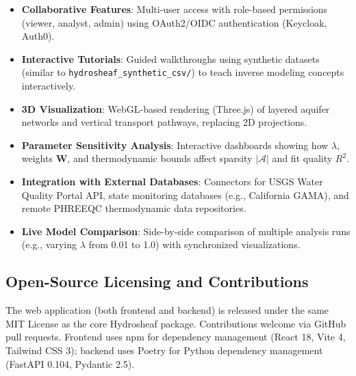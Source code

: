 \begin{itemize}
	\item \textbf{Collaborative Features}: Multi-user access with role-based permissions (viewer, analyst, admin) using OAuth2/OIDC authentication (Keycloak, Auth0).
	\item \textbf{Interactive Tutorials}: Guided walkthroughs using synthetic datasets (similar to \texttt{hydrosheaf\_synthetic\_csv/}) to teach inverse modeling concepts interactively.
	\item \textbf{3D Visualization}: WebGL-based rendering (Three.js) of layered aquifer networks and vertical transport pathways, replacing 2D projections.
	\item \textbf{Parameter Sensitivity Analysis}: Interactive dashboards showing how $\lambda$, weights $\mathbf{W}$, and thermodynamic bounds affect sparsity $|\mathcal{A}|$ and fit quality $R^2$.
	\item \textbf{Integration with External Databases}: Connectors for USGS Water Quality Portal API, state monitoring databases (e.g., California GAMA), and remote PHREEQC thermodynamic data repositories.
	\item \textbf{Live Model Comparison}: Side-by-side comparison of multiple analysis runs (e.g., varying $\lambda$ from 0.01 to 1.0) with synchronized visualizations.
\end{itemize}

\subsection{Open-Source Licensing and Contributions}

The web application (both frontend and backend) is released under the same MIT License as the core Hydrosheaf package. Contributions welcome via GitHub pull requests. Frontend uses npm for dependency management (React 18, Vite 4, Tailwind CSS 3); backend uses Poetry for Python dependency management (FastAPI 0.104, Pydantic 2.5).


